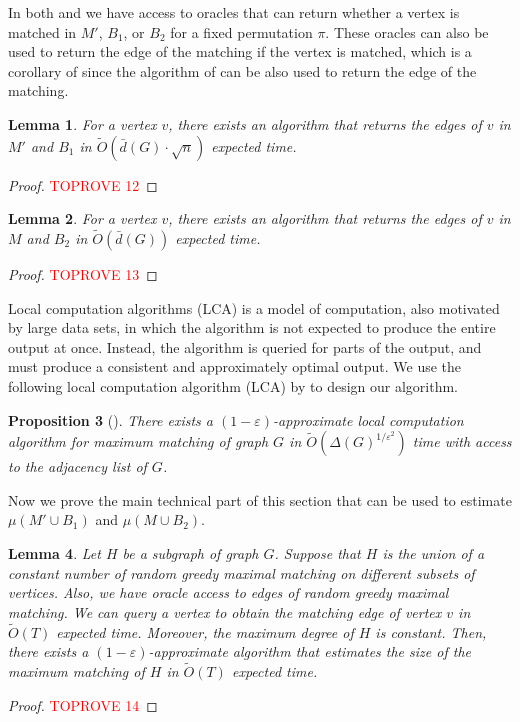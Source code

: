 \documentclass[letterpaper,11pt]{article}
\renewcommand{\epsilon}{\varepsilon}
\newcommand{\wt}[1]{\ensuremath{\widetilde{#1}}}
\newtheorem{lemma}{Lemma}[section]
\newtheorem{proposition}[lemma]{Proposition}
\begin{document}
In both  and  we have access to oracles that can return whether a vertex is matched in $M'$, $B_1$, or $B_2$ for a fixed permutation $\pi$. These oracles can also be used to return the edge of the matching if the vertex is matched, which is a corollary of  since the algorithm of  can be also used to return the edge of the matching.

\begin{lemma}\label{lem:edge-oracle-1}
    For a vertex $v$, there exists an algorithm that returns the edges of $v$ in $M'$ and $B_1$ in $\wt{O}(\bar{d}(G) \cdot \sqrt{n})$ expected time.
\end{lemma}
\begin{proof}\textcolor{red}{TOPROVE 12}\end{proof}

\begin{lemma}\label{lem:edge-oracle-2}
    For a vertex $v$, there exists an algorithm that returns the edges of $v$ in $M$ and $B_2$ in $\wt{O}(\bar{d}(G))$ expected time.
\end{lemma}
\begin{proof}\textcolor{red}{TOPROVE 13}\end{proof}

Local computation algorithms (LCA) is a model of computation, also motivated by large data sets, in which the algorithm is not expected to produce the entire output at once. Instead, the algorithm is queried for parts of the output, and must produce a consistent and approximately optimal output. We use the following local computation algorithm (LCA) by \cite{LeviRY17} to design our algorithm. 

\begin{proposition}[\cite{LeviRY17}]\label{prop:lca}
    There exists a $(1-\epsilon)$-approximate local computation algorithm for maximum matching of graph $G$ in $\wt{O}(\Delta(G)^{1/\epsilon^2})$ time with access to the adjacency list of $G$.
\end{proposition}

Now we prove the main technical part of this section that can be used to estimate $\mu(M' \cup B_1)$ and $\mu(M \cup B_2)$.

\begin{lemma}\label{lem:matching-sparse-levi}
    Let $H$ be a subgraph of graph $G$. Suppose that $H$ is the union of a constant number of random greedy maximal matching on different subsets of vertices. Also, we have oracle access to edges of random greedy maximal matching. We can query a vertex to obtain the matching edge of vertex $v$ in $\wt{O}(T)$ expected time.  Moreover, the maximum degree of $H$ is constant. Then, there exists a $(1-\epsilon)$-approximate algorithm that estimates the size of the maximum matching of $H$ in $\wt{O}(T)$ expected time.
\end{lemma}
\begin{proof}\textcolor{red}{TOPROVE 14}\end{proof}
\end{document}
